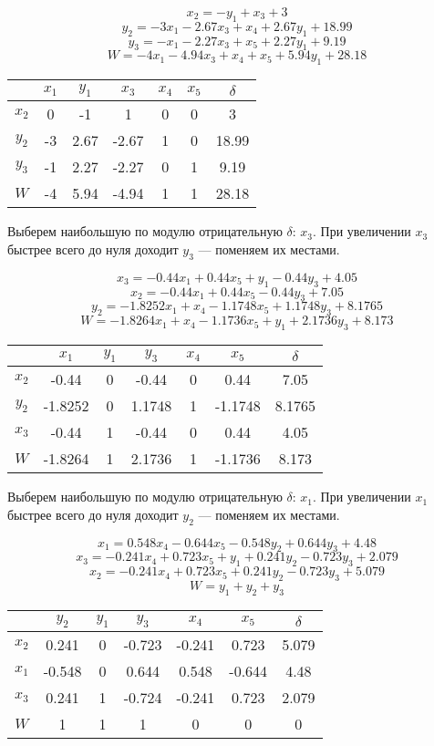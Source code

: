 \documentclass[listings]{labreport}
\begin{document}
$$x_2 = -y_1 + x_3 + 3$$
$$y_2 = -3 x_1 - 2.67 x_3 + x_4 + 2.67 y_1 + 18.99$$
$$y_3 = -x_1 - 2.27 x_3 + x_5 + 2.27 y_1 + 9.19$$
$$W = -4 x_1 - 4.94 x_3 + x_4 + x_5 + 5.94 y_1 + 28.18$$

\begin{center}
\begin{tabular}{c|cccccc}
& $x_1$ & $y_1$ & $x_3$ & $x_4$ & $x_5$ & $\delta$ \\\hline
$x_2$ & 0 & -1 & 1 & 0 & 0 & 3 \\
$y_2$ & -3 & 2.67 & -2.67 & 1 & 0 & 18.99\\
$y_3$ & -1 & 2.27 & -2.27 & 0 & 1 & 9.19\\\hline
$W$ & -4 & 5.94 & -4.94 & 1 & 1 & 28.18\\
\end{tabular}
\end{center}

Выберем наибольшую по модулю отрицательную $\delta$: $x_3$. При увеличении $x_3$
быстрее всего до нуля доходит $y_3$ — поменяем их местами.

$$x_3 = -0.44 x_1 + 0.44 x_5 + y_1 - 0.44 y_3 + 4.05$$
$$x_2 = -0.44 x_1 + 0.44 x_5 - 0.44 y_3 + 7.05$$
$$y_2 = -1.8252 x_1 + x_4 - 1.1748 x_5 + 1.1748 y_3 + 8.1765$$
$$W = -1.8264 x_1 + x_4 - 1.1736 x_5 + y_1 + 2.1736 y_3 + 8.173$$

\begin{center}
\begin{tabular}{c|cccccc}
& $x_1$ & $y_1$ & $y_3$ & $x_4$ & $x_5$ & $\delta$ \\\hline
$x_2$ & -0.44 & 0 & -0.44 & 0 & 0.44 & 7.05 \\
$y_2$ & -1.8252 & 0 & 1.1748 & 1 & -1.1748 & 8.1765\\
$x_3$ & -0.44 & 1 & -0.44 & 0 & 0.44 & 4.05\\\hline
$W$ & -1.8264 & 1 & 2.1736 & 1 & -1.1736 & 8.173\\
\end{tabular}
\end{center}

Выберем наибольшую по модулю отрицательную $\delta$: $x_1$. При увеличении $x_1$
быстрее всего до нуля доходит $y_2$ — поменяем их местами.

$$x_1 = 0.548 x_4 - 0.644 x_5 - 0.548 y_2 + 0.644 y_3 + 4.48$$
$$x_3 = -0.241 x_4 + 0.723 x_5 + y_1 + 0.241 y_2 - 0.723 y_3 + 2.079$$
$$x_2 = -0.241 x_4 + 0.723 x_5 + 0.241 y_2 - 0.723 y_3 + 5.079$$
$$W = y_1 + y_2 + y_3$$

\begin{center}
\begin{tabular}{c|cccccc}
& $y_2$ & $y_1$ & $y_3$ & $x_4$ & $x_5$ & $\delta$ \\\hline
$x_2$ & 0.241 & 0 & -0.723 & -0.241& 0.723 & 5.079 \\
$x_1$ & -0.548 & 0 & 0.644 & 0.548 & -0.644 & 4.48 \\
$x_3$ & 0.241 & 1 & -0.724 & -0.241 & 0.723 & 2.079\\\hline
$W$ & 1 & 1 & 1 & 0 & 0 & 0\\
\end{tabular}
\end{center}
\end{document}
